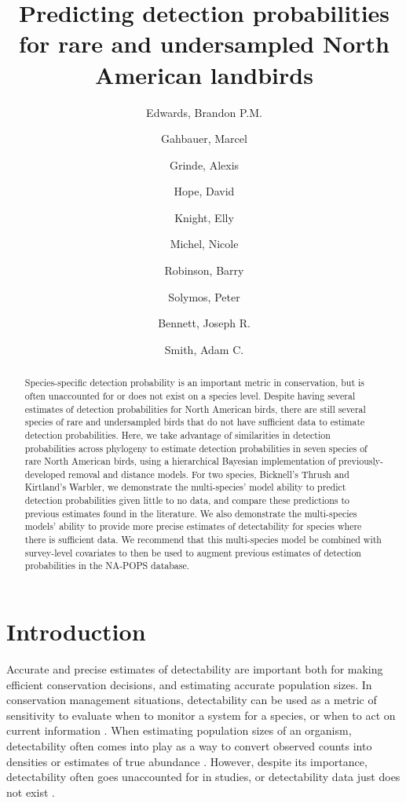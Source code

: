 \documentclass[12pt]{article}
\title{Predicting detection probabilities for rare and undersampled North American landbirds}
\author{
	Edwards, Brandon P.M.\\
	\and
	Gahbauer, Marcel\\
	\and
	Grinde, Alexis\\
	\and
	Hope, David\\
	\and
	Knight, Elly\\
	\and
	Michel, Nicole\\
	\and
	Robinson, Barry\\
	\and
	Solymos, Peter\\
	\and
	Bennett, Joseph R.\\
	\and
	Smith, Adam C.\\
}
\begin{document}
\maketitle

\begin{abstract}
	
	Species-specific detection probability is an important metric in conservation, but is often unaccounted for or does not exist on a species level. Despite having several estimates of detection probabilities for North American birds, there are still several species of rare and undersampled birds that do not have sufficient data to estimate detection probabilities. Here, we take advantage of similarities in detection probabilities across phylogeny to estimate detection probabilities in seven species of rare North American birds, using a hierarchical Bayesian implementation of previously-developed removal and distance models. For two species, Bicknell's Thrush and Kirtland's Warbler, we demonstrate the multi-species' model ability to predict detection probabilities given little to no data, and compare these predictions to previous estimates found in the literature. We also demonstrate the multi-species models' ability to provide more precise estimates of detectability for species where there is sufficient data. We recommend that this multi-species model be combined with survey-level covariates to then be used to augment previous estimates of detection probabilities in the NA-POPS database.

\end{abstract}

\section{Introduction}

\par Accurate and precise estimates of detectability are important both for making efficient conservation decisions, and estimating accurate population sizes.
In conservation management situations, detectability can be used as a metric of sensitivity to evaluate when to monitor a system for a species, or when to act on current information \citep{canessa_when_2015, bennett_when_2018}. 
When estimating population sizes of an organism, detectability often comes into play as a way to convert observed counts into densities or estimates of true abundance \citep{solymos_calibrating_2013, johnson_defense_2008}.
However, despite its importance, detectability often goes unaccounted for in studies, or detectability data just does not exist \citep{bennett_how_2023}.
\end{document}
